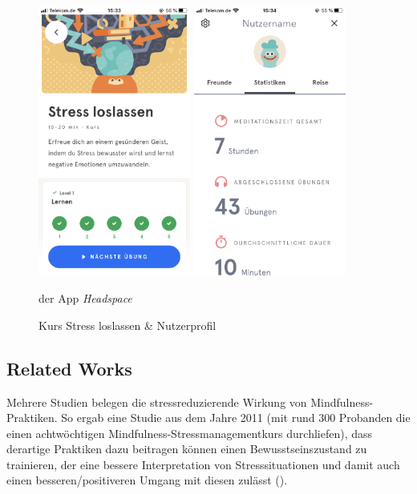 \documentclass[10pt]{article}
\newcommand{\zit}[1]{(\cite{#1})}
\begin{document}
\begin{figure}[h]
 \centering
 \begin{minipage}[t]{0.45\linewidth} 
  \centering 
 \includegraphics[width=5cm,keepaspectratio]{headspace1}
  \end{minipage}
  \begin{minipage}[t]{0.45\linewidth} 
  \centering 
   \includegraphics[width=5cm,keepaspectratio]{headspace2}
  \end{minipage}
    \caption{Kurs Stress loslassen \& Nutzerprofil}  der App \textit{Headspace} 
   \label{fig:headspace}
\end{figure}


\subsection{Related Works}
Mehrere Studien belegen die stressreduzierende Wirkung von Mindfulness-Praktiken. So ergab eine Studie aus dem Jahre 2011 (mit rund 300 Probanden die einen achtwöchtigen Mindfulness-Stressmanagementkurs durchliefen), dass derartige Praktiken dazu beitragen können einen Bewusstseinszustand zu trainieren, der eine bessere Interpretation von Stresssituationen und damit auch einen besseren/positiveren Umgang mit diesen zulässt \zit{MindfulnessStudy1}. 
\end{document}
